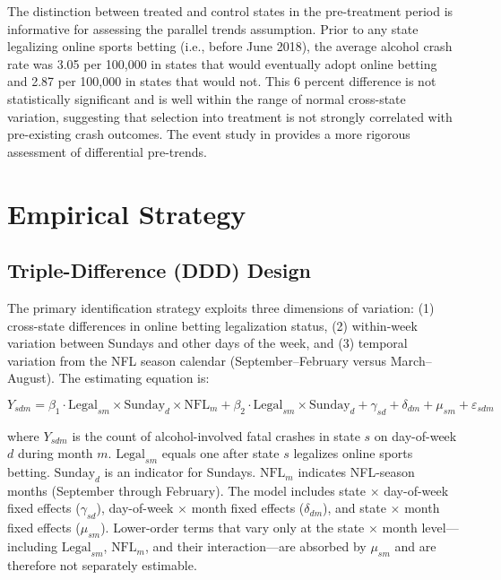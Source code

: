 \documentclass[12pt]{article}
\begin{document}
The distinction between treated and control states in the pre-treatment period is informative for assessing the parallel trends assumption. Prior to any state legalizing online sports betting (i.e., before June 2018), the average alcohol crash rate was 3.05 per 100,000 in states that would eventually adopt online betting and 2.87 per 100,000 in states that would not. This 6 percent difference is not statistically significant and is well within the range of normal cross-state variation, suggesting that selection into treatment is not strongly correlated with pre-existing crash outcomes. The event study in  provides a more rigorous assessment of differential pre-trends.

\section{Empirical Strategy}
\label{sec:strategy}

\subsection{Triple-Difference (DDD) Design}

The primary identification strategy exploits three dimensions of variation: (1) cross-state differences in online betting legalization status, (2) within-week variation between Sundays and other days of the week, and (3) temporal variation from the NFL season calendar (September--February versus March--August). The estimating equation is:

\begin{equation}
Y_{sdm} = \beta_1 \cdot \text{Legal}_{sm} \times \text{Sunday}_d \times \text{NFL}_m
+ \beta_2 \cdot \text{Legal}_{sm} \times \text{Sunday}_d + \gamma_{sd} + \delta_{dm} + \mu_{sm} + \varepsilon_{sdm}
\label{eq:ddd}
\end{equation}

\noindent where $Y_{sdm}$ is the count of alcohol-involved fatal crashes in state $s$ on day-of-week $d$ during month $m$. $\text{Legal}_{sm}$ equals one after state $s$ legalizes online sports betting. $\text{Sunday}_d$ is an indicator for Sundays. $\text{NFL}_m$ indicates NFL-season months (September through February). The model includes state $\times$ day-of-week fixed effects ($\gamma_{sd}$), day-of-week $\times$ month fixed effects ($\delta_{dm}$), and state $\times$ month fixed effects ($\mu_{sm}$). Lower-order terms that vary only at the state $\times$ month level---including $\text{Legal}_{sm}$, $\text{NFL}_m$, and their interaction---are absorbed by $\mu_{sm}$ and are therefore not separately estimable.
\end{document}
